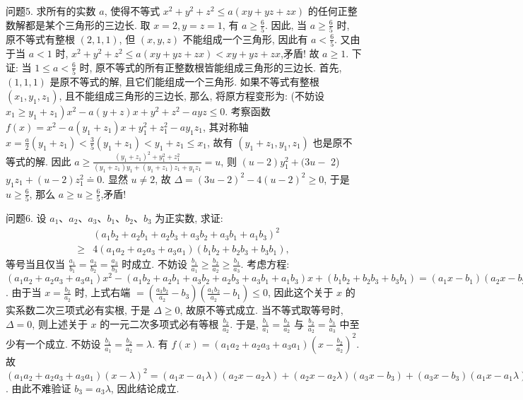 问题5. 求所有的实数 $a$, 使得不等式 $x^2+y^2+z^2 \leqslant a(x y+y z+z x)$ 的任何正整数解都是某个三角形的三边长.
取 $x=2, y=z=1$, 有 $a \geqslant \frac{6}{5}$. 因此, 当 $a \geqslant \frac{6}{5}$ 时, 原不等式有整根 $(2,1,1)$, 但 $(x, y, z)$ 不能组成一个三角形, 因此有 $a<\frac{6}{5}$.
又由于当 $a<1$ 时, $x^2+y^2+z^2 \leqslant a(x y+y z+z x)<x y+y z+z x$,矛盾! 故 $a \geqslant 1$. 下证: 当 $1 \leqslant a<\frac{6}{5}$ 时, 原不等式的所有正整数根皆能组成三角形的三边长.
首先, $(1,1,1)$ 是原不等式的解, 且它们能组成一个三角形.
如果不等式有整根 $\left(x_1, y_1, z_1\right)$, 且不能组成三角形的三边长, 那么, 将原方程变形为: (不妨设 $\left.x_1 \geqslant y_1+z_1\right) x^2-a(y+z) x+y^2+z^2-a y z \leqslant 0$.
考察函数 $f(x)=x^2-a\left(y_1+z_1\right) x+y_1^2+z_1^2-a y_1 z_1$, 其对称轴 $x= \frac{a}{2}\left(y_1+z_1\right)<\frac{3}{5}\left(y_1+z_1\right)<y_1+z_1 \leqslant x_1$, 故有 $\left(y_1+z_1, y_1, z_1\right)$ 也是原不等式的解.
因此 $a \geqslant \frac{\left(y_1+z_1\right)^2+y_1^2+z_1^2}{\left(y_1+z_1\right) y_1+\left(y_1+z_1\right) z_1+y_1 z_1}=u$, 则 $(u-2) y_1^2+(3 u-$ 2) $y_1 z_1+(u-2) z_1^2 \doteq 0$.
显然 $u \neq 2$, 故 $\Delta=(3 u-2)^2-4(u-2)^2 \geqslant 0$, 于是 $u \geqslant \frac{6}{5}$, 那么 $a \geqslant u \geqslant \frac{6}{5}$,矛盾!



问题6. 设 $a_1 、 a_2 、 a_3 、 b_1 、 b_2 、 b_3$ 为正实数, 求证:
$$
\begin{aligned}
& \left(a_1 b_2+a_2 b_1+a_2 b_3+a_3 b_2+a_3 b_1+a_1 b_3\right)^2 \\
\geqslant & 4\left(a_1 a_2+a_2 a_3+a_3 a_1\right)\left(b_1 b_2+b_2 b_3+b_3 b_1\right),
\end{aligned}
$$
等号当且仅当 $\frac{a_1}{b_1}=\frac{a_2}{b_2}=\frac{a_3}{b_3}$ 时成立.
不妨设 $\frac{b_1}{a_1} \geqslant \frac{b_2}{a_2} \geqslant \frac{b_3}{a_3}$. 考虑方程: $\left(a_1 a_2+a_2 a_3+a_3 a_1\right) x^2-\left(a_1 b_2+\right. \left.a_2 b_1+a_3 b_2+a_2 b_3+a_3 b_1+a_1 b_3\right) x+\left(b_1 b_2+b_2 b_3+b_3 b_1\right)=\left(a_1 x-b_1\right)\left(a_2 x-\right. \left.b_2\right)+\left(a_2 x-b_2\right)\left(a_3 x-b_3\right)+\left(a_3 x-b_3\right)\left(a_1 x-b_1\right)$.
由于当 $x=\frac{b_2}{a_2}$ 时, 上式右端 $=\left(\frac{a_3 b_2}{a_2}-b_3\right)\left(\frac{a_1 b_2}{a_2}-b_1\right) \leqslant 0$, 因此这个关于 $x$ 的实系数二次三项式必有实根, 于是 $\Delta \geqslant 0$, 故原不等式成立.
当不等式取等号时, $\Delta=0$, 则上述关于 $x$ 的一元二次多项式必有等根 $\frac{b_2}{a_2}$.
于是, $\frac{b_1}{a_1}=\frac{b_2}{a_2}$ 与 $\frac{b_2}{a_2}=\frac{b_3}{a_3}$ 中至少有一个成立.
不妨设 $\frac{b_1}{a_1}=\frac{b_2}{a_2}=\lambda$. 有 $f(x)=\left(a_1 a_2+a_2 a_3+a_3 a_1\right)\left(x-\frac{b_2}{a_2}\right)^2$.
故 $\left(a_1 a_2+a_2 a_3+a_3 a_1\right)(x-\lambda)^2=\left(a_1 x-a_1 \lambda\right)\left(a_2 x-a_2 \lambda\right)+\left(a_2 x-\right. \left.a_2 \lambda\right)\left(a_3 x-b_3\right)+\left(a_3 x-b_3\right)\left(a_1 x-a_1 \lambda\right)$.
由此不难验证 $b_3=a_3 \lambda$, 因此结论成立.




